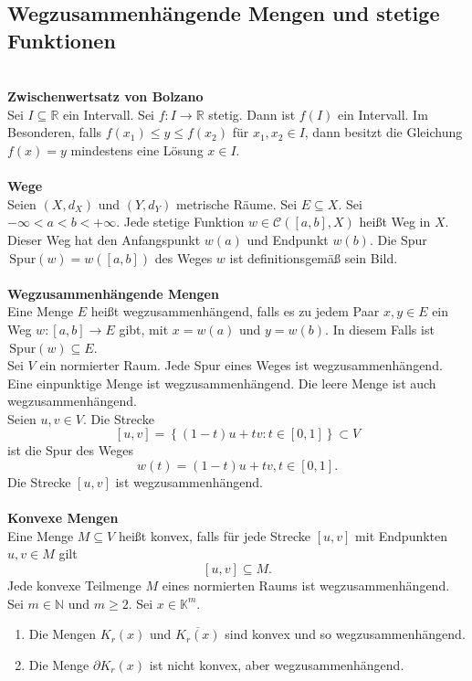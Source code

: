 \documentclass[a4paper,12pt]{article}
\begin{document}
\subsection{Wegzusammenhängende Mengen und stetige Funktionen}
\hfill\\\textbf{Zwischenwertsatz von Bolzano}\\ 
Sei $I\subseteq \mathbb{R}$ ein Intervall. Sei $f:I\rightarrow \mathbb{R}$ stetig. Dann ist $f(I)$ ein Intervall. Im Besonderen, falls $f(x_1)\leq y\leq f(x_2)$ für $x_1,x_2 \in I$, dann besitzt die Gleichung $f(x)=y$ mindestens eine Lösung $x \in I$.
\\\hfill\\\textbf{Wege}\\ 
Seien $(X,d_X)$ und $(Y,d_Y)$ metrische Räume. Sei $E\subseteq X$. Sei $-\infty<a<b<+\infty$. Jede stetige Funktion $w \in \mathcal{C}\left([a,b],X\right)$ heißt Weg in $X$. Dieser Weg hat den Anfangspunkt $w(a)$ und Endpunkt $w(b)$. Die Spur $\,\text{Spur}(w)=w\left([a,b]\right)$ des Weges $w$ ist definitionsgemäß sein Bild.
\\\hfill\\\textbf{Wegzusammenhängende Mengen}\\ 
Eine Menge $E$ heißt wegzusammenhängend, falls es zu jedem Paar $x,y \in E$ ein Weg $w:[a,b]\rightarrow E$ gibt, mit $x=w(a)$ und $y=w(b)$. In diesem Falls ist $\,\text{Spur}(w)\subseteq E$.\\\indent
Sei $V$ ein normierter Raum. Jede Spur eines Weges ist wegzusammenhängend. Eine einpunktige Menge ist wegzusammenhängend. Die leere Menge ist auch wegzusammenhängend.\\\indent
Seien $u,v \in V$. Die Strecke 
\[ 
        [u,v]=\left\{(1-t)u+tv:t \in [0,1]\right\}\subset V
\] 
ist die Spur des Weges
\[ 
        w(t)=(1-t)u+tv,t \in [0,1]
.\] 
Die Strecke $[u,v]$ ist wegzusammenhängend.
\\\hfill\\\textbf{Konvexe Mengen}\\ 
Eine Menge $M\subseteq V$ heißt konvex, falls für jede Strecke $[u,v]$  mit Endpunkten $u,v \in M$ gilt
\[ 
        [u,v]\subseteq M
.\] 
Jede konvexe Teilmenge $M$ eines normierten Raums ist wegzusammenhängend.\\\indent
Sei $m \in \mathbb{N}$ und $m\geq 2$. Sei $x \in \mathbb{K}^m$.
\begin{enumerate}[label=\arabic*.]
        \item Die Mengen $K_r(x)$ und $\overline{K_r(x)}$ sind konvex und so wegzusammenhängend.
        \item Die Menge $\partial K_r(x)$ ist nicht konvex, aber wegzusammenhängend.
\end{enumerate}
\end{document}
